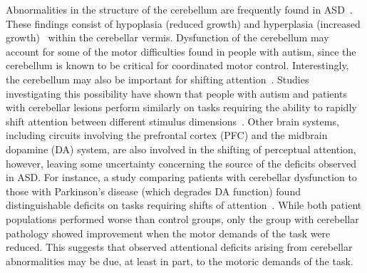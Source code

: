Abnormalities in the structure of the cerebellum are frequently found in ASD~\cite{AkshoomoffNA:2000:Neurological,RefWorks:133}. These findings consist of hypoplasia (reduced growth) and hyperplasia (increased growth)~\cite{RodierPM:1996:AutismCerebellum} within the cerebellar vermis. Dysfunction of the cerebellum may account for some of the motor difficulties found in people with autism, since the cerebellum is known to be critical for coordinated motor control.  Interestingly, the cerebellum may also be important for shifting attention~\cite{RefWorks:135,CourchesneE:1994:CerebellumAttentionShift}. Studies investigating this possibility have shown that people with autism and patients with cerebellar lesions perform similarly on tasks requiring the ability to rapidly shift attention between different stimulus dimensions~\cite{CourchesneE:1994:CerebellumAttentionShift,RefWorks:136,RefWorks:134}. Other brain systems, including circuits involving the prefrontal cortex (PFC) and the midbrain dopamine (DA) system, are also involved in the shifting of perceptual attention, however, leaving some uncertainty concerning the source of the deficits observed in ASD. For instance, a study comparing patients with cerebellar dysfunction to those with Parkinson's disease (which degrades DA function) found distinguishable deficits on tasks requiring shifts of attention~\cite{RefWorks:145}. While both patient populations performed worse than control groups, only the group with cerebellar pathology showed improvement when the motor demands of the task were reduced. This suggests that observed attentional deficits arising from cerebellar abnormalities may be due, at least in part, to the motoric demands of the task.

%

